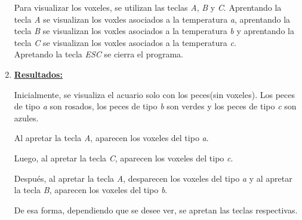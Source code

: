\documentclass[letterpaper,11pt,oneside]{article}
\begin{document}
\begin{enumerate}
        Para visualizar los voxeles, se utilizan las teclas \textit{A}, \textit{B} y \textit{C}. Aprentando la tecla \textit{A} se visualizan los voxles asociados a la temperatura \textit{a}, aprentando la tecla \textit{B} se visualizan los voxles asociados a la temperatura \textit{b} y aprentando la tecla \textit{C} se visualizan los voxles asociados a la temperatura \textit{c}.\\

        Apretando la tecla \textit{ESC} se cierra el programa.

    \item \textbf{\underline{Resultados:}} 

        Inicialmente, se visualiza el acuario solo con los peces(sin voxeles). Los peces de tipo \textit{a} son rosados, los peces de tipo \textit{b} son verdes y los peces de tipo \textit{c} son azules.


        Al apretar la tecla \textit{A}, aparecen los voxeles del tipo \textit{a}.

        Luego, al apretar la tecla \textit{C}, aparecen los voxeles del tipo \textit{c}.

        Después, al apretar la tecla \textit{A}, desparecen los voxeles del tipo \textit{a} y al apretar la tecla \textit{B}, aparecen los voxeles del tipo \textit{b}.

        De esa forma, dependiendo que se desee ver, se apretan las teclas respectivas.

\end{enumerate}

\end{document}
